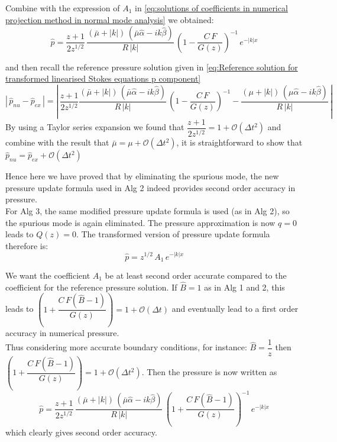 Combine with the expression of $A_1$ in \eqref{eq:solutions of coefficients in numerical projection method in normal mode analysis} we obtained:\\
\begin{equation}
\hat{p} = \dfrac{z+1}{2z^{1/2}}\,\dfrac{(\bar{\mu} + |k|)\,(\bar{\mu} \hat{\alpha}  -ik \hat{\beta})}{R\,|k|}\,(1 - \dfrac{C\,F}{G(z)})^{-1}\,e^{-|k|x}
\end{equation}

and then recall the reference pressure solution given in \eqref{eq:Reference solution for transformed linearised Stokes equations p component}
\begin{equation*}
|\,\hat{p}_{nu} - \hat{p}_{ex}\,| =|\, \dfrac{z+1}{2 z^{1/2}} \dfrac{(\bar{\mu} + |k|)\,(\bar{\mu} \hat{\alpha}  -ik \hat{\beta})}{R\,|k|} \,(1 - \dfrac{C\,F}{G(z)})^{-1} - \dfrac{(\mu + |k|)\,(\mu \hat{\alpha}  -ik \hat{\beta})}{R\,|k|}\,|
\end{equation*}
By using a Taylor series expansion we found that $\dfrac{z+1}{2z^{1/2}} = 1 + \mathcal{O}(\Delta t^2)$ and combine with the result that $\bar{\mu} = \mu + \mathcal{O}(\Delta t^2)$, it is straightforward to show that $\hat{p}_{nu} = \hat{p}_{ex} + \mathcal{O}(\Delta t^2)$

Hence here we have proved that by eliminating the spurious mode, the new pressure update formula used in Alg 2 indeed provides second order accuracy in pressure.\\

For Alg 3, the same modified pressure update formula is used (as in Alg 2), so the spurious mode is again eliminated. The pressure approximation is now $q = 0$ leads to $Q(z) = 0$. The transformed version of pressure update formula therefore is:
\begin{equation*}
\hat{p} = z^{1/2}\,A_1\,e^{-|k|x}
\end{equation*}

We want the coefficient $A_1$ be at least second order accurate compared to the coefficient for the reference pressure solution. If $\hat{B}=1$ as in Alg 1 and 2, this leads to $\left(1+\dfrac{C\,F(\hat{B}-1)}{G(z)}\right) = 1+\mathcal{O}(\Delta t)$ and eventually lead to a first order accuracy in numerical pressure.\\

Thus considering more accurate boundary conditions, for instance: $\hat{B}=\dfrac{1}{z}$ then $\left(1+\dfrac{C\,F(\hat{B}-1)}{G(z)}\right)= 1+\mathcal{O}(\Delta t^2)$. Then the pressure is now written as
\begin{equation*}
\hat{p} = \dfrac{z+1}{2z^{1/2}}\,\dfrac{(\bar{\mu} + |k|)\,(\bar{\mu} \hat{\alpha}  -ik \hat{\beta})}{R\,|k|}\,\left(1+\dfrac{C\,F(\hat{B}-1)}{G(z)}\right)^{-1}\,e^{-|k|x}
\end{equation*}
which clearly gives second order accuracy.\\

